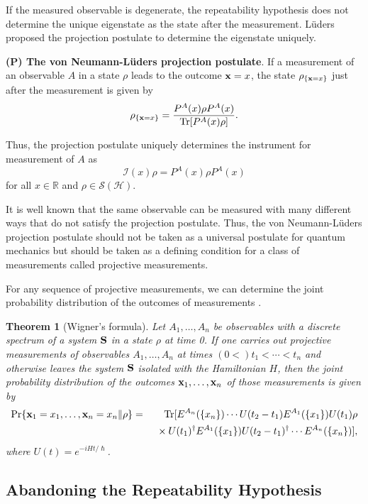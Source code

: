 \documentclass[12pt]{article}
\newcommand{\beq}{\begin{equation}}
\newcommand{\eeq}{\end{equation}}
\newcommand{\beqa}{\begin{eqnarray}}
\newcommand{\eeqa}{\end{eqnarray}}
\newcommand{\bS}{{\bf S}}
\newcommand{\cH}{{\mathcal H}}
\newcommand{\cI}{{\mathcal I}}
\newcommand{\cS}{{\mathcal S}}
\newcommand{\da}{\dagger}
\newcommand{\nn}{\nonumber}
\newcommand{\rh}{\rho}
\newcommand{\Tr}{\mbox{\rm Tr}}
\newcommand{\bx}{{\bf x}}
\newtheorem{Theorem}{Theorem}
\newcommand{\R}{\mathbb{R}}
\begin{document}
If the measured observable is degenerate, the repeatability hypothesis 
does not determine the unique eigenstate as the state after the measurement.
L\"{u}ders \cite{Lud51} proposed the projection postulate to determine
the eigenstate uniquely.
\bigskip

 {\bf  (P) The von Neumann-L\"{u}ders projection postulate}.
 If a measurement of an observable $A$ in a state 
$\rh$ leads to the outcome $\bx=x$, the state  $\rh_{\{\bx=x\}}$  just after the measurement is given by
\beqa
\rh_{\{\bx=x\}}=\frac{P^{A}(x)\rh P^{A}(x)}{\Tr[P^{A}(x)\rh]}.
\eeqa
\bigskip

Thus, the projection postulate uniquely determines the instrument for
measurement of $A$ as
\beq
\cI(x)\rh=P^{A}(x)\rh P^{A}(x)
\eeq
for all $x\in\R$ and $\rh\in\cS(\cH)$.

It is well known that the same observable can be measured with many different ways
that do not satisfy the projection postulate.  Thus, the von Neumann-L\"{u}ders projection 
postulate should not be taken as a universal postulate for quantum mechanics 
but should be taken as a defining condition for a class of measurements called projective measurements.

For any sequence of projective measurements, we can determine the joint probability distribution 
of the outcomes of measurements \cite{Wig63+}.

\begin{Theorem}[Wigner's formula]
Let $A_{1},\ldots,A_{n}$ be observables with a discrete spectrum
of a system $\bS$ in a state $\rh$ at time 0.
If one carries out projective measurements 
of observables $A_{1},\ldots,A_{n}$ at times 
$(0<)t_{1}<\cdots<t_{n}$ and otherwise leaves the system $\bS$ isolated
with the Hamiltonian $H$,
then the joint probability distribution of the outcomes 
$\bx_{1},\ldots,\bx_{n}$ of those measurements is given by
\beqa
\Pr\{\bx_{1}=x_{1},\ldots,\bx_{n}= x_{n}\|\rh\}
&=&
\Tr[E^{A_{n}}(\{x_{n}\})\cdots U(t_{2}-t_{1})E^{A_{1}}(\{x_{1}\})U(t_{1})\rh\nn
\\
& &\mbox{ }\times
U(t_{1})^{\da}E^{A_{1}}(\{x_{1}\})U(t_{2}-t_{1})^{\da}
\cdots E^{A_{n}}(\{x_{n}\})],\nn\\
\eeqa
where $U(t)=e^{-iHt/\hslash}$.
\end{Theorem}


\subsection{Abandoning the Repeatability Hypothesis}
\label{se:ABRH}
\end{document}

